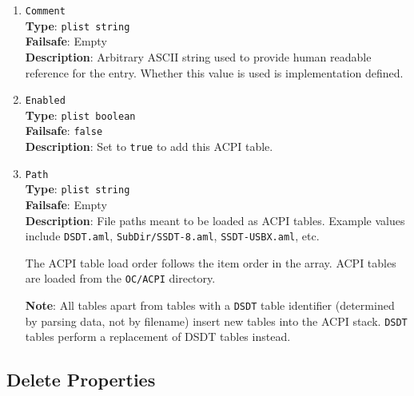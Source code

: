 \documentclass[]{article}
\begin{document}
\begin{enumerate}

\item
  \texttt{Comment}\\
  \textbf{Type}: \texttt{plist\ string}\\
  \textbf{Failsafe}: Empty\\
  \textbf{Description}: Arbitrary ASCII string used to provide human readable
  reference for the entry. Whether this value is used is implementation defined.

\item
  \texttt{Enabled}\\
  \textbf{Type}: \texttt{plist\ boolean}\\
  \textbf{Failsafe}: \texttt{false}\\
  \textbf{Description}: Set to \texttt{true} to add this ACPI table.

\item
  \texttt{Path}\\
  \textbf{Type}: \texttt{plist\ string}\\
  \textbf{Failsafe}: Empty\\
  \textbf{Description}: File paths meant to be loaded as ACPI tables.
  Example values include \texttt{DSDT.aml}, \texttt{SubDir/SSDT-8.aml},
  \texttt{SSDT-USBX.aml}, etc.

  The ACPI table load order follows the item order in the array. ACPI tables
  are loaded from the \texttt{OC/ACPI} directory.

  \textbf{Note}: All tables apart from tables with a \texttt{DSDT} table identifier
  (determined by parsing data, not by filename) insert new tables into the ACPI stack.
  \texttt{DSDT} tables perform a replacement of DSDT tables instead.

\end{enumerate}

\subsection{Delete Properties}\label{acpipropsdelete}
\end{document}
